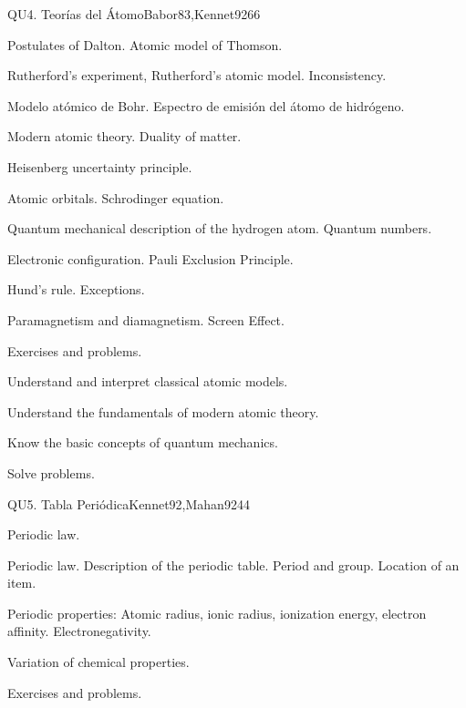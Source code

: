 \begin{syllabus}
\begin{unit}{}{QU4. Teorías del Átomo}{Babor83,Kennet92}{6}{6}
\begin{topics}
      \item Postulates of Dalton. Atomic model of Thomson.
      \item Rutherford's experiment, Rutherford's atomic model. Inconsistency.
      \item Modelo atómico de Bohr. Espectro de emisión del átomo de hidrógeno.
      \item Modern atomic theory. Duality of matter.
      \item Heisenberg uncertainty principle.
      \item Atomic orbitals. Schrodinger equation.
      \item Quantum mechanical description of the hydrogen atom. Quantum numbers.
      \item Electronic configuration. Pauli Exclusion Principle.
      \item Hund's rule. Exceptions.
      \item Paramagnetism and diamagnetism. Screen Effect.
      \item Exercises and problems.
   \end{topics}

   \begin{learningoutcomes}
      \item Understand and interpret classical atomic models.
      \item Understand the fundamentals of modern atomic theory.
      \item Know the basic concepts of quantum mechanics.
      \item Solve problems.

   \end{learningoutcomes}
\end{unit}

\begin{unit}{}{QU5. Tabla Periódica}{Kennet92,Mahan92}{4}{4}
\begin{topics}	
	\item Periodic law.
	\item Periodic law. Description of the periodic table. Period and group. Location of an item.
	\item Periodic properties: Atomic radius, ionic radius, ionization energy, electron affinity. Electronegativity.
	\item Variation of chemical properties.
	\item Exercises and problems.


\end{topics}
\end{unit}
\end{syllabus}
